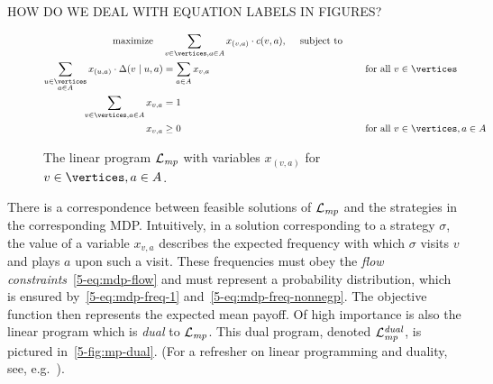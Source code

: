 
HOW DO WE DEAL WITH EQUATION LABELS IN FIGURES?

\begin{figure}[h]
	\begin{alignat}{2}
	\text{{maximize}} \quad &\sum_{v\in \vertices, a \in \actions} x_{(v,a)} \cdot \colouring(v,a),\quad \textrm{ 
			subject to }\nonumber \\
	  \sum_{\substack{u\in\vertices\\ a \in \actions}} x_{(u,a)}\cdot \probTranFunc(v\mid u,a) &= \sum_{a \in \actions} x_{v,a}
		&\quad&\text{for all $v\in \vertices$}\label{5-eq:mdp-flow} \\
	 \sum_{v\in\vertices,a\in \actions} x_{v,a}&=1 &&\label{5-eq:mdp-freq-1} \\
	 x_{v,a} &\geq 0  &&\text{for all $v\in \vertices,a\in \actions$} \label{5-eq:mdp-freq-nonnegp}
	\end{alignat}
	\caption{The linear program $\mathcal{L}_{\mathit{mp}}$ with variables $x_{(v,a)}$ for  $v\in \vertices,a\in \actions$.}
	\label{5-fig:mp-lin}
\end{figure}


There is a correspondence between feasible solutions of $\mathcal{L}_{\mathit{mp}}$ and the strategies in the corresponding MDP. Intuitively, in a solution corresponding to a strategy $\sigma$, the value of a variable $x_{v,a}$ describes the expected frequency with which $\sigma$ visits $v$ and plays $a$ upon such a visit. These frequencies must obey the \emph{flow constraints}~\cref{5-eq:mdp-flow} and must represent a probability distribution, which is ensured by~\cref{5-eq:mdp-freq-1} and~\cref{5-eq:mdp-freq-nonnegp}. The objective function then represents the expected mean payoff. Of high importance is also the linear program which is \emph{dual} to $\mathcal{L}_{\mathit{mp}}$. This dual program, denoted $\mathcal{L}_{\mathit{mp}}^{\mathit{dual}}$, is pictured in~\cref{5-fig:mp-dual}. (For a refresher on linear programming and duality, see, e.g.~\cite{Matousek:2007}).

